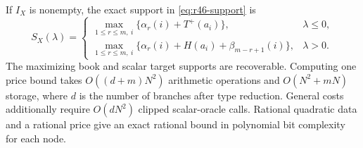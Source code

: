 \begin{theorem}\label{thm:r46-box}
If $I_X$ is nonempty, the exact support in \eqref{eq:r46-support} is
\begin{equation}\label{eq:r46-glue}
 S_X(\lambda)=
 \begin{cases}
 \displaystyle\max_{1\leq r\leq m,\ i}\{\alpha_r(i)+T^+(a_i)\},&\lambda\leq0,\\[2mm]
 \displaystyle\max_{1\leq r\leq m,\ i}\{\alpha_r(i)+H(a_i)+\beta_{m-r+1}(i)\},&\lambda>0.
 \end{cases}
\end{equation}
The maximizing book and scalar target supports are recoverable. Computing one price bound takes $O((d+m)N^2)$ arithmetic operations and $O(N^2+mN)$ storage, where $d$ is the number of branches after type reduction. General costs additionally require $O(dN^2)$ clipped scalar-oracle calls. Rational quadratic data and a rational price give an exact rational bound in polynomial bit complexity for each node.
\end{theorem}
